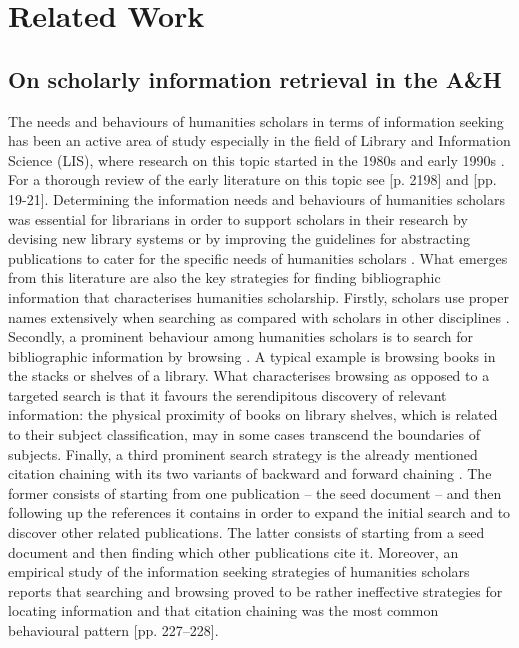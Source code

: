 \section{Related Work}\label{sec:related-work}

\subsection{On scholarly information retrieval in the A\&H}\label{sec:scholarly-IR}

The needs and behaviours of humanities scholars in terms of information seeking has been an active area of study especially in the field of Library and Information Science (LIS), where research on this topic started in the 1980s and early 1990s \cite{stone_humanities_1982, ellis_behavioural_1989, watson-boone_information_1994}. For a thorough review of the early literature on this topic see \cite{wiberley_jr_humanities_2009}[p. 2198] and \cite{benardou_understanding_2010}[pp. 19-21].
Determining the information needs and behaviours of humanities scholars was essential for librarians in order to support scholars in their research by devising new library systems or by improving the guidelines for abstracting publications to cater for the specific needs of humanities
scholars \cite{tibbo_abstracting_1993}. What emerges from this literature are also the key strategies for finding bibliographic information that characterises humanities scholarship. Firstly, scholars use proper names extensively when searching as compared with scholars in other disciplines \cite{wiberley_patterns_1989, bates_getty_1996, palmer_scholarly_2009}. Secondly, a prominent behaviour among humanities scholars is to search for bibliographic information by browsing \cite{bates_getty_1996, ellis_behavioural_1989, meho_modeling_2003}. A typical example is browsing books in the stacks or shelves of a library. What characterises browsing as opposed to a targeted search is that it favours the serendipitous discovery of relevant information: the physical proximity of books on library shelves, which is related to their subject classification, may in some cases transcend the boundaries of subjects. Finally, a third prominent search strategy is the already mentioned citation chaining with its two variants of backward and forward chaining \cite{ellis_behavioural_1989,buchanan_information_2005}. The former consists of starting from one publication – the seed document -- and then following up the references it contains in order to expand the initial search and to discover other related publications. The latter consists of starting from a seed document and then finding which other publications cite it. Moreover, an empirical study of the information seeking strategies of humanities scholars reports that searching and browsing proved to be rather ineffective strategies for locating information and that citation chaining was the most common behavioural pattern \cite{buchanan_information_2005}[pp. 227–228].

